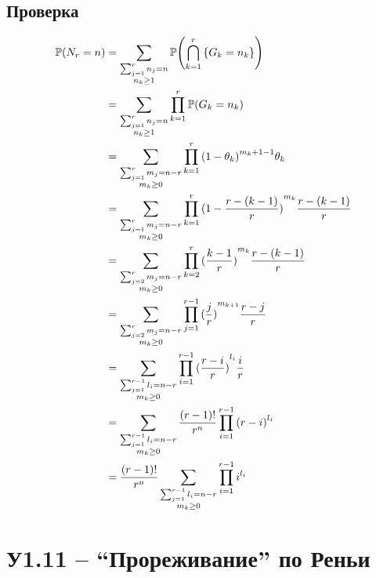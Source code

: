 \documentclass[a4paper]{article}
\let\originalleft\left
\let\originalright\right
\renewcommand{\left}{\mathopen{}\mathclose\bgroup\originalleft}
\renewcommand{\right}{\aftergroup\egroup\originalright}
\newcommand{\obj}[1]{{\left\{ #1 \right \}}}
\newcommand{\brac}[1]{{\left ( #1 \right )}}
\newcommand{\pr}[0]{{\mathbb{P}}}
\begin{document}
\subsection*{Проверка} %
\label{sub:snaity_check}

\begin{align*}
\pr\brac{N_r = n}
	&= \sum_{\substack{\sum_{j=1}^r n_j = n \\ n_k\geq1}} \pr\brac{\bigcap_{k=1}^r \obj{G_k = n_k}} \\
	&= \sum_{\substack{\sum_{j=1}^r n_j = n \\ n_k\geq1}} \prod_{k=1}^r \pr\brac{G_k = n_k} \\
	&= \sum_{\substack{\sum_{j=1}^r m_j = n-r \\ m_k\geq0}} \prod_{k=1}^r {(1-\theta_k)}^{m_k+1-1} \theta_k \\
	&= \sum_{\substack{\sum_{j=1}^r m_j = n-r \\ m_k\geq0}} \prod_{k=1}^r {(1-\frac{r-(k-1)}{r})}^{m_k} \frac{r-(k-1)}{r} \\
	&= \sum_{\substack{\sum_{j=2}^r m_j = n-r \\ m_k\geq0}} \prod_{k=2}^r {(\frac{k-1}{r})}^{m_k} \frac{r-(k-1)}{r} \\
	&= \sum_{\substack{\sum_{j=2}^r m_j = n-r \\ m_k\geq0}} \prod_{j=1}^{r-1} {(\frac{j}{r})}^{m_{k+1}} \frac{r-j}{r} \\
	&= \sum_{\substack{\sum_{j=1}^{r-1} l_i = n-r \\ m_k\geq0}} \prod_{i=1}^{r-1} {(\frac{r-i}{r})}^{l_i} \frac{i}{r} \\
	&= \sum_{\substack{\sum_{j=1}^{r-1} l_i = n-r \\ m_k\geq0}} \frac{(r-1)!}{r^n} \prod_{i=1}^{r-1} {(r-i)}^{l_i} \\
	&= \frac{(r-1)!}{r^n} \sum_{\substack{\sum_{j=1}^{r-1} l_i = n-r \\ m_k\geq0}} \prod_{i=1}^{r-1} i^{l_i} \\
\end{align*}




\section{У1.11 -- ``Прореживание'' по Реньи} %
\label{sec:task_1_11}
\end{document}
